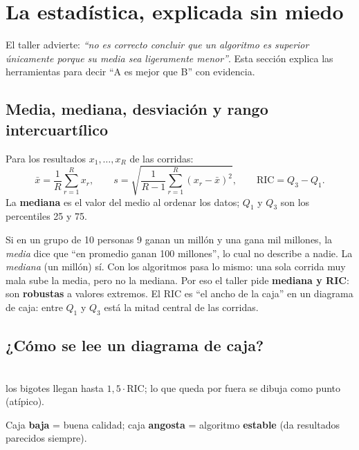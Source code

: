 \documentclass[11pt,a4paper]{article}
\begin{document}
\section{La estadística, explicada sin miedo}\label{sec:estadistica}
El taller advierte: \emph{``no es correcto concluir que un algoritmo es superior únicamente porque su media sea ligeramente menor''}.
Esta sección explica las herramientas para decir ``A es mejor que B'' con evidencia.

\subsection{Media, mediana, desviación y rango intercuartílico}
\begin{mate}
Para los resultados $x_1,\dots,x_R$ de las corridas:
\[
\bar x=\frac1R\sum_{r=1}^R x_r,\qquad s=\sqrt{\frac{1}{R-1}\sum_{r=1}^R (x_r-\bar x)^2},\qquad \text{RIC}=Q_3-Q_1 .
\]
La \textbf{mediana} es el valor del medio al ordenar los datos; $Q_1$ y $Q_3$ son los percentiles 25 y 75.
\end{mate}
\begin{idea}
Si en un grupo de 10 personas 9 ganan un millón y una gana mil millones, la \emph{media} dice que ``en promedio ganan 100 millones'', lo cual
no describe a nadie. La \emph{mediana} (un millón) sí. Con los algoritmos pasa lo mismo: una sola corrida muy mala sube la media, pero no la mediana.
Por eso el taller pide \textbf{mediana y RIC}: son \textbf{robustas} a valores extremos. El RIC es ``el ancho de la caja'' en un diagrama de caja:
entre $Q_1$ y $Q_3$ está la mitad central de las corridas.
\end{idea}

\subsection{¿Cómo se lee un diagrama de caja?}
\begin{center}
\\[-0.2em]
{\footnotesize *los bigotes llegan hasta $1{,}5\cdot$RIC; lo que queda por fuera se dibuja como punto (atípico).}
\end{center}
Caja \textbf{baja} = buena calidad; caja \textbf{angosta} = algoritmo \textbf{estable} (da resultados parecidos siempre).
\end{document}
